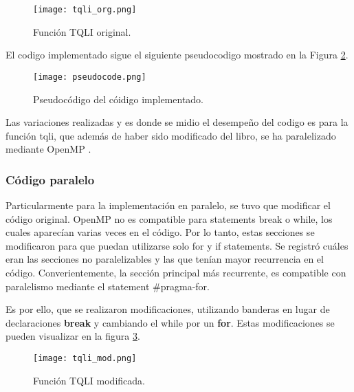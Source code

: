 \begin{figure}
	\centering
	\texttt{[image: tqli\_org.png]}
	\caption{Función TQLI original.}
	\label{fig:tqli_original}
\end{figure}


El codigo implementado sigue el siguiente pseudocodigo mostrado en la Figura \ref{fig:pseudo}. 

\begin{figure}[htbp]
	\centering
	\texttt{[image: pseudocode.png]}
	\caption{Pseudocódigo del cóidigo implementado.}
	\label{fig:pseudo}
\end{figure}


Las variaciones realizadas y es donde se midio el desempeño del codigo es para la función tqli, que además de haber sido modificado del libro, se ha paralelizado mediante OpenMP \cite{al2017parallel}.


\subsubsection{Código paralelo}
Particularmente para la implementación en paralelo, se tuvo que modificar el código original. OpenMP no es compatible para statements break o while, los cuales aparecían varias veces en el código. Por lo tanto, estas secciones se modificaron para que puedan utilizarse solo for y if statements. Se registró cuáles eran las secciones no paralelizables y las que tenían mayor recurrencia en el código. Converientemente, la sección principal más recurrente, es compatible con paralelismo mediante el statement \#pragma-for. 


Es por ello, que se realizaron modificaciones, utilizando banderas en lugar de declaraciones \textbf{break} y cambiando el while por un \textbf{for}. Estas modificaciones se pueden visualizar en la figura \ref{fig:tqli_modificada}.

\begin{figure}
	\centering
	\texttt{[image: tqli\_mod.png]}
	\caption{Función TQLI modificada.}
	\label{fig:tqli_modificada}
\end{figure}

